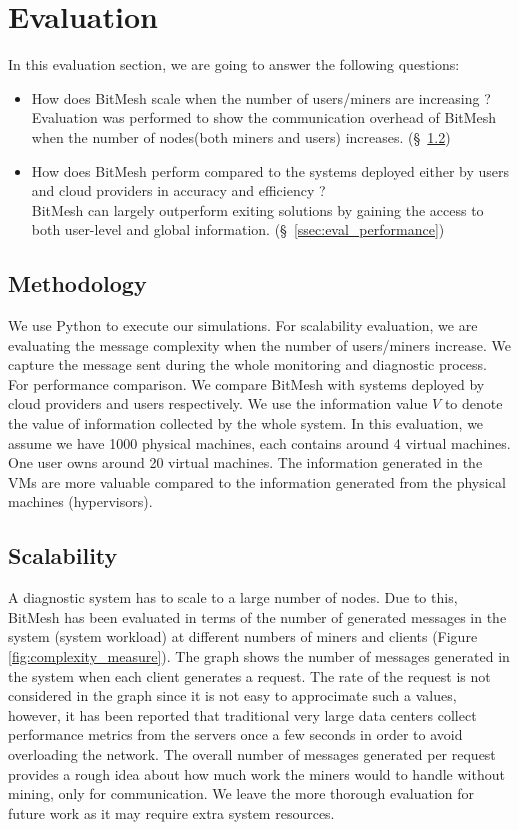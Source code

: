 \documentclass[11px]{article}
\newcommand{\projTitle}{BitMesh\xspace}
\begin{document}
\section{Evaluation}
In this evaluation section, we are going to answer the following questions:

\begin{itemize}
  \item How does \projTitle scale when the number of users/miners are increasing ? \\
      Evaluation was performed to show the communication overhead of \projTitle when the number of nodes(both miners and users) increases. (\S~\ref{ssec:eval_scalability})
  \item How does \projTitle perform compared to the systems deployed either by users and cloud providers in accuracy and efficiency ? \\
      \projTitle can largely outperform exiting solutions by gaining the access to both user-level and global information. (\S~\ref{ssec:eval_performance})
\end{itemize}

\subsection{Methodology}
We use Python to execute our simulations. For scalability evaluation, we are evaluating the message complexity when the number of users/miners increase. We capture the message sent during the whole monitoring and diagnostic process. For performance comparison. We compare \projTitle with systems deployed by cloud providers and users respectively. We use the information value $V$ to denote the value of information collected by the whole system. In this evaluation, we assume we have 1000 physical machines, each contains around 4 virtual machines. One user owns around 20 virtual machines. The information generated in the VMs are more valuable compared to the information generated from the physical machines (hypervisors).

\subsection{Scalability}
\label{ssec:eval_scalability}
A diagnostic system has to scale to a large number of nodes. Due to this, \projTitle has been evaluated in terms of the number of generated messages in the system (system workload) at different numbers of miners and clients (Figure \ref{fig:complexity_measure}). The graph shows the number of messages generated in the system when each client generates a request. The rate of the request is not considered in the graph since it is not easy to approcimate such a values, however, it has been reported that traditional very large data centers collect performance metrics from the servers once a few seconds \cite{microsoft-autopilot} in order to avoid overloading the network. The overall number of messages generated per request provides a rough idea about how much work the miners would to handle without mining, only for communication. We leave the more thorough evaluation for future work as it may require extra system resources.
\end{document}
